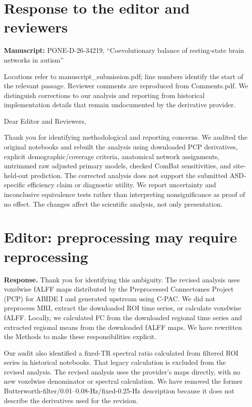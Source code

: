 \documentclass[11pt]{article}
\begin{document}
\section*{Response to the editor and reviewers}

\textbf{Manuscript:} PONE-D-26-34219, “Coevolutionary balance of resting-state brain networks in autism”


Locations refer to manuscript\_submission.pdf; line numbers identify the start of the relevant passage. Reviewer comments are reproduced from Comments.pdf. We distinguish corrections to our analysis and reporting from historical implementation details that remain undocumented by the derivative provider.


Dear Editor and Reviewers,


Thank you for identifying methodological and reporting concerns. We audited the original notebooks and rebuilt the analysis using downloaded PCP derivatives, explicit demographic/coverage criteria, anatomical network assignments, untrimmed raw adjusted primary models, checked ComBat sensitivities, and site-held-out prediction. The corrected analysis does not support the submitted ASD-specific efficiency claim or diagnostic utility. We report uncertainty and inconclusive equivalence tests rather than interpreting nonsignificance as proof of no effect. The changes affect the scientific analysis, not only presentation.


\section*{Editor: preprocessing may require reprocessing}

\textbf{Response.} Thank you for identifying this ambiguity. The revised analysis uses voxelwise fALFF maps distributed by the Preprocessed Connectomes Project (PCP) for ABIDE I and generated upstream using C-PAC. We did not preprocess MRI, extract the downloaded ROI time series, or calculate voxelwise fALFF. Locally, we calculated FC from the downloaded regional time series and extracted regional means from the downloaded fALFF maps. We have rewritten the Methods to make these responsibilities explicit.


Our audit also identified a fixed-TR spectral ratio calculated from filtered ROI series in historical notebooks. That legacy calculation is excluded from the revised analysis. The revised analysis uses the provider's maps directly, with no new voxelwise denominator or spectral calculation. We have removed the former Butterworth-filter/0.01--0.08-Hz/fixed-0.25-Hz description because it does not describe the derivatives used for the revision.
\end{document}
